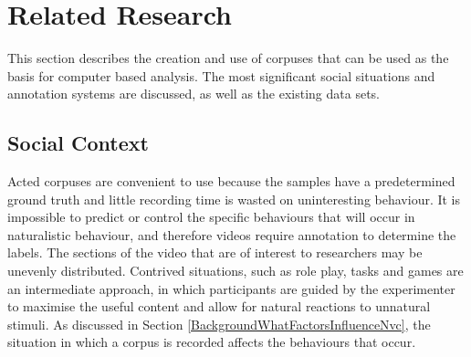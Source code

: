 \section{Related Research}
\label{BackgroundCorpus}

This section describes the creation and use of corpuses that can be used as the basis for computer based analysis. The most significant social situations and annotation systems are discussed, as well as the existing data sets. %



\subsection{Social Context}
\label{BackgroundSocialContextUsedInTwoTalk}


Acted corpuses are convenient to use because the samples have a predetermined ground truth and little recording time is wasted on uninteresting behaviour. It is impossible to predict or control the specific behaviours that will occur in naturalistic behaviour, and therefore videos require annotation to determine the labels. The sections of the video that are of interest to researchers may be unevenly distributed. Contrived situations, such as role play, tasks and games are an intermediate approach, in which participants are guided by the experimenter to maximise the useful content and allow for natural reactions to unnatural stimuli. As discussed in Section \ref{BackgroundWhatFactorsInfluenceNvc}, the situation in which a corpus is recorded affects the behaviours that occur. 

